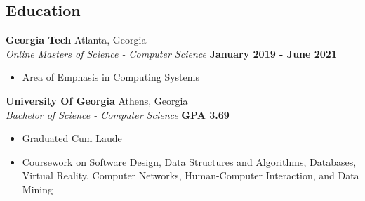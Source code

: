 \documentclass[margin,line]{resume}
\begin{document}
\begin{resume}
	\section{\mysidestyle Education}
	
	\textbf{Georgia Tech} Atlanta, Georgia \vspace{2mm}\\\vspace{1mm}%
	\textsl{Online Masters of Science - Computer Science} \hfill \textbf{January 2019 - June 2021} \vspace{2mm}
	\begin{itemize}
		\item Area of Emphasis in Computing Systems 
	\end{itemize}
	
	\textbf{University Of Georgia} Athens, Georgia \vspace{2mm}\\\vspace{1mm}%
	\textsl{Bachelor of Science - Computer Science} \hfill \textbf{GPA 3.69}\vspace{2mm}
	\begin{itemize}
		\item Graduated Cum Laude
		\item Coursework on Software Design, Data Structures and Algorithms, Databases, Virtual Reality, Computer Networks, Human-Computer Interaction, and Data Mining
	\end{itemize}

	\vspace{-1.5mm}

	\end{resume}
	
\end{document}

